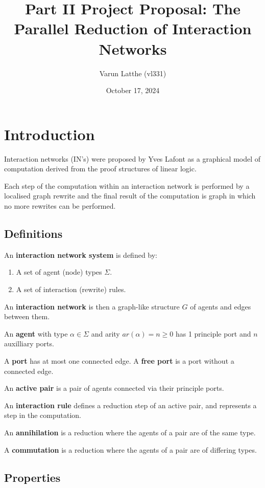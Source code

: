 \documentclass{article}
\title{Part II Project Proposal: The Parallel Reduction of Interaction Networks}
\author{Varun Latthe (vl331)}
\date{October 17, 2024}
\begin{document}
    \setlength{\droptitle}{-5em}   %
    \maketitle
\section{Introduction}
Interaction networks (IN's) were proposed by Yves Lafont \cite{lafont90} as a graphical model of computation derived from the proof structures of linear logic.

Each step of the computation within an interaction network is performed by a localised graph rewrite and the final result of the computation is graph in which no more rewrites can be performed.

\subsection{Definitions}

An \textbf{interaction network system} is defined by:
\begin{enumerate}
    \item A set of agent (node) types $\Sigma$.
    \item A set of interaction (rewrite) rules.
\end{enumerate}

An \textbf{interaction network} is then a graph-like structure $G$ of agents and edges between them.

An \textbf{agent} with type $\alpha \in \Sigma$ and arity $ar(\alpha)=n\ge 0$ has 1 principle port and $n$ auxilliary ports.  

A \textbf{port} has at most one connected edge. A \textbf{free port} is a port without a connected edge.

An \textbf{active pair} is a pair of agents connected via their principle ports.

An \textbf{interaction rule} defines a reduction step of an active pair, and represents a step in the computation.

\quad An \textbf{annihilation} is a reduction where the agents of a pair are of the same type.

\quad A \textbf{commutation} is a reduction where the agents of a pair are of differing types.

\subsection{Properties}
\end{document}

